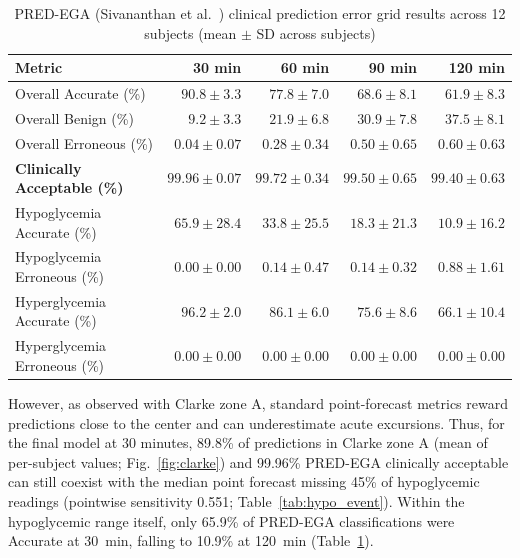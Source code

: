 \documentclass[journal]{IEEEtran}
\begin{document}
\begin{table}[t]
\centering
\caption{PRED-EGA (Sivananthan et al.~\cite{ref53}) clinical prediction error grid results across 12 subjects (mean $\pm$ SD across subjects)}
\label{tab:predega}
\footnotesize
\begin{tabular}{lrrrr}
\toprule
Metric & 30 min & 60 min & 90 min & 120 min \\
\midrule
Overall Accurate (\%) & $90.8 \pm 3.3$ & $77.8 \pm 7.0$ & $68.6 \pm 8.1$ & $61.9 \pm 8.3$ \\
Overall Benign (\%) & $9.2 \pm 3.3$ & $21.9 \pm 6.8$ & $30.9 \pm 7.8$ & $37.5 \pm 8.1$ \\
Overall Erroneous (\%) & $0.04 \pm 0.07$ & $0.28 \pm 0.34$ & $0.50 \pm 0.65$ & $0.60 \pm 0.63$ \\
\textbf{Clinically Acceptable (\%)} & $\mathbf{99.96 \pm 0.07}$ & $\mathbf{99.72 \pm 0.34}$ & $\mathbf{99.50 \pm 0.65}$ & $\mathbf{99.40 \pm 0.63}$ \\
\midrule
Hypoglycemia Accurate (\%) & $65.9 \pm 28.4$ & $33.8 \pm 25.5$ & $18.3 \pm 21.3$ & $10.9 \pm 16.2$ \\
Hypoglycemia Erroneous (\%) & $0.00 \pm 0.00$ & $0.14 \pm 0.47$ & $0.14 \pm 0.32$ & $0.88 \pm 1.61$ \\
Hyperglycemia Accurate (\%) & $96.2 \pm 2.0$ & $86.1 \pm 6.0$ & $75.6 \pm 8.6$ & $66.1 \pm 10.4$ \\
Hyperglycemia Erroneous (\%) & $0.00 \pm 0.00$ & $0.00 \pm 0.00$ & $0.00 \pm 0.00$ & $0.00 \pm 0.00$ \\
\bottomrule
\end{tabular}
\end{table}

However, as observed with Clarke zone A, standard point-forecast metrics reward predictions close to the center and can underestimate acute excursions. Thus, for the final model at 30 minutes, 89.8\% of predictions in Clarke zone A (mean of per-subject values; Fig.~\ref{fig:clarke}) and 99.96\% PRED-EGA clinically acceptable can still coexist with the median point forecast missing 45\% of hypoglycemic readings (pointwise sensitivity 0.551; Table~\ref{tab:hypo_event}). Within the hypoglycemic range itself, only 65.9\% of PRED-EGA classifications were Accurate at 30~min, falling to 10.9\% at 120~min (Table~\ref{tab:predega}).
\end{document}
